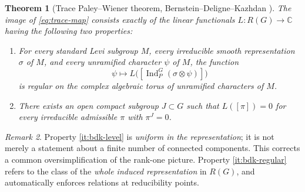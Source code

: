 \documentclass[12pt,letterpaper]{amsart}
\numberwithin{equation}{section}
\newtheorem{theorem}{Theorem}[section]
\theoremstyle{definition}
\theoremstyle{remark}
\newtheorem{remark}[theorem]{Remark}
\newcommand{\Ind}{\operatorname{Ind}}
\begin{document}
\begin{theorem}[Trace Paley--Wiener theorem, Bernstein--Deligne--Kazhdan \cite{BDK86}]\label{thm:BDK}
The image of \eqref{eq:trace-map} consists exactly of the linear functionals $L:R(G)\to\mathbb C$ having the following two properties:
\begin{enumerate}[label=(\roman*),leftmargin=*]
\item\label{it:bdk-regular} For every standard Levi subgroup $M$, every irreducible smooth representation $\sigma$ of $M$, and every unramified character $\psi$ of $M$, the function
\[
\psi\longmapsto L\bigl([\Ind_P^G(\sigma\otimes\psi)]\bigr)
\]
is regular on the complex algebraic torus of unramified characters of $M$.
\item\label{it:bdk-level} There exists an open compact subgroup $J\subset G$ such that $L([\pi])=0$ for every irreducible admissible $\pi$ with $\pi^J=0$.
\end{enumerate}
\end{theorem}
\begin{remark}
Property \ref{it:bdk-level} is \emph{uniform in the representation}; it is not merely a statement about a finite number of connected components. This corrects a common oversimplification of the rank-one picture.  Property \ref{it:bdk-regular} refers to the class of the \emph{whole induced representation} in $R(G)$, and automatically enforces relations at reducibility points.
\end{remark}
\end{document}
